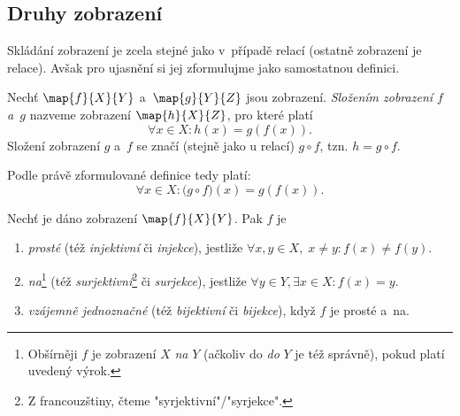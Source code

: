 \subsection{Druhy zobrazení}
Skládání zobrazení je zcela stejné jako v~případě relací (ostatně zobrazení je relace). Avšak pro ujasnění si jej zformulujme jako samostatnou definici.
\begin{definition}\label{def:skladani_zobrazeni}
    Nechť $\map{f}{X}{Y}$ a~$\map{g}{Y}{Z}$ jsou zobrazení. \emph{Složením zobrazení $f$ a~$g$} nazveme zobrazení $\map{h}{X}{Z}$, pro které platí
    \begin{equation*}
        \forall x\in X: h(x)=g(f(x)).
    \end{equation*}
    Složení zobrazení $g$ a~$f$ se značí (stejně jako u relací) $g\circ f$, tzn. $h=g \circ f$.
\end{definition}
Podle právě zformulované definice tedy platí:
\begin{equation*}
    \forall x\in X: \bigl(g\circ f\bigr)(x)=g(f(x)).
\end{equation*}
\needspace{1cm}
\begin{definition}\label{def:druhy_zobrazeni}
    Nechť je dáno zobrazení $\map{f}{X}{Y}$. Pak $f$ je
    \begin{enumerate}[label=(\roman*)]
        \item \emph{prosté} (též \emph{injektivní} či \emph{injekce}), jestliže $\forall x,y\in X,\;x\neq y: f(x)\neq f(y)$.
        \item \emph{na}\footnote{Obšírněji $f$ je zobrazení $X$ \emph{na} $Y$ (ačkoliv do \emph{do} $Y$ je též správně), pokud platí uvedený výrok.} (též \emph{surjektivní}\footnote{Z francouzštiny, čteme "syrjektivní"/"syrjekce".} či \emph{surjekce}), jestliže $\forall y\in Y, \exists x\in X: f(x)=y$.
        \item \emph{vzájemně jednoznačné} (též \emph{bijektivní} či \emph{bijekce}), když $f$ je prosté a~na.
    \end{enumerate}
\end{definition}

